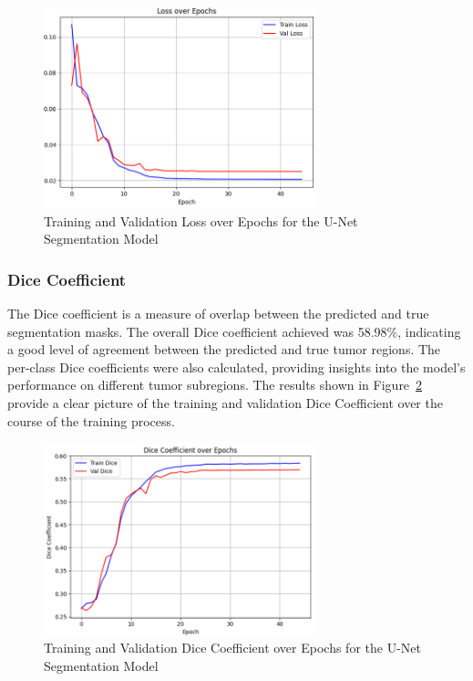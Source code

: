 \begin{figure}[h]
  \centering
  \includegraphics[width=0.7\textwidth]{Images/Chapter3/unet_loss.png}
  \caption{Training and Validation Loss over Epochs for the U-Net Segmentation Model}
  \label{fig:unet-loss}
\end{figure}

\subsubsection{Dice Coefficient}
The Dice coefficient is a measure of overlap between the predicted and true segmentation masks. The overall Dice coefficient achieved was 58.98\%, indicating a good level of agreement between the predicted and true tumor regions. The per-class Dice coefficients were also calculated, providing insights into the model's performance on different tumor subregions. The results shown in Figure~\ref{fig:unet-dice} provide a clear picture of the training and validation Dice Coefficient over the course of the training process.
\begin{figure}[h]
  \centering
  \includegraphics[width=0.7\textwidth]{Images/Chapter3/unet_dice.png}
  \caption{Training and Validation Dice Coefficient over Epochs for the U-Net Segmentation Model}
  \label{fig:unet-dice}
\end{figure}


